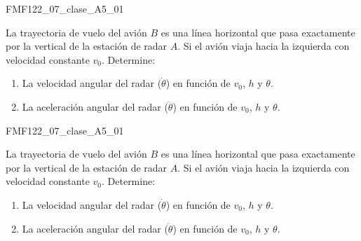 \documentclass[12pt,letterpaper]{report}
\begin{document}


\begin{ejemploclase}[0.6]{FMF122_07_clase_A5_01}

 La trayectoria de vuelo del avión $B$ es una línea horizontal que pasa exactamente por la vertical de la estación de radar $A$. Si el avión viaja hacia la izquierda con velocidad constante $v_0$. Determine:
 
\begin{enumerate}
\item La velocidad angular del radar ($\dot{\theta}$) en función de $v_0$, $h$ y $\theta$.
\item  La aceleración angular del radar ($\ddot{\theta}$) en función de $v_0$, $h$ y $\theta$.
\end{enumerate}

\vspace{60mm}

\end{ejemploclase} 





\begin{tareacasa}{FMF122_07_clase_A5_01}

 La trayectoria de vuelo del avión $B$ es una línea horizontal que pasa exactamente por la vertical de la estación de radar $A$. Si el avión viaja hacia la izquierda con velocidad constante $v_0$. Determine:
 
\begin{enumerate}
\item La velocidad angular del radar ($\dot{\theta}$) en función de $v_0$, $h$ y $\theta$.
\item  La aceleración angular del radar ($\ddot{\theta}$) en función de $v_0$, $h$ y $\theta$.
\end{enumerate}

\vspace{30mm}

\end{tareacasa} 


\end{document}
